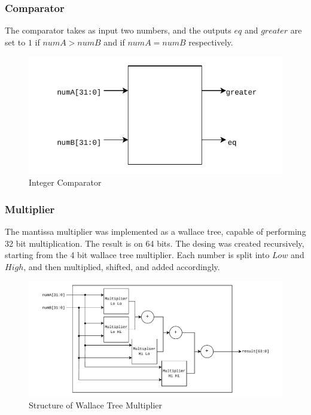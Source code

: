 \documentclass[a4paper,10pt]{article}
\begin{document}
    \newpage
    \subsubsection{Comparator}
    The comparator takes as input two numbers, and the outputs $eq$ and $greater$ are set to $1$ if $numA > numB$ and if $numA = numB$ respectively.\\
    \begin{figure}[h]
     \centering
     \caption{Integer Comparator}
     \includegraphics{comparator.pdf}
    \end{figure}


    \subsubsection{Multiplier}
    The mantissa multiplier was implemented as a wallace tree, capable of performing 32 bit multiplication. The result is on 64 bits. The desing was created recursively, starting from the 4 bit wallace tree multiplier. Each number is split into $Low$ and $High$, and then multiplied, shifted, and added accordingly.
    \begin{figure}[h]
     \centering
     \caption{Structure of Wallace Tree Multiplier}
     \includegraphics[scale=0.75]{multiplier.pdf}
    \end{figure}
\end{document}
